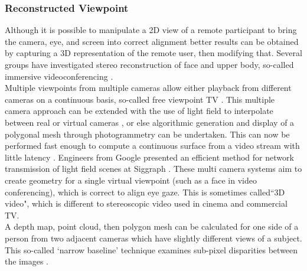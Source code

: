 

   
\subsubsection{Reconstructed Viewpoint}
            Although it is possible to manipulate a 2D view of a remote participant to bring the camera, eye, and screen into correct alignment better results can be obtained by capturing a 3D representation of the remote user, then modifying that. Several groups have investigated stereo reconstruction of face and upper body, so-called immersive videoconferencing \cite{Atzpadin2004}. \\                   Multiple viewpoints from multiple cameras allow either playback from different cameras on a continuous basis, so-called free viewpoint TV \cite{Zhang2007}. This multiple camera approach can be extended with the use of light field to interpolate between real or virtual cameras \cite{Ott1993, Al-Saidi2009, doi:10.1117/12.854571}, or else algorithmic generation and display of a polygonal mesh through photogrammetry can be undertaken. This can now be performed fast enough to compute a continuous surface from a video stream with little latency \cite{Criminisi:2003ji}. Engineers from Google presented an efficient method for network transmission of light field scenes at Siggraph \cite{MichaelBroxton}.  These multi camera systems aim to create geometry for a single virtual viewpoint (such as a face in video conferencing), which is correct to align eye gaze. This is sometimes called``3D video", which is different to stereoscopic video used in cinema and commercial TV.\\
 A depth map, point cloud, then polygon mesh can be calculated for one side of a person from two adjacent cameras which have slightly different views of a subject.  This so-called `narrow baseline' technique examines sub-pixel disparities between the images \cite{Knoblauch2008}. \\